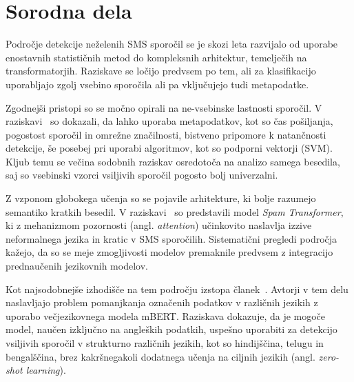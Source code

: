 \documentclass[sigconf,nonacm]{acmart}
\begin{document}


\section{Sorodna dela}

Področje detekcije neželenih SMS sporočil se je skozi leta razvijalo od uporabe enostavnih statističnih metod do kompleksnih arhitektur, 
temelječih na transformatorjih. Raziskave se ločijo predvsem po tem, ali za klasifikacijo uporabljajo zgolj vsebino sporočila ali pa 
vključujejo tudi metapodatke.

Zgodnejši pristopi so se močno opirali na ne-vsebinske lastnosti sporočil. V raziskavi~\cite{6133257} so dokazali, da lahko uporaba 
metapodatkov, kot so čas pošiljanja, pogostost sporočil in omrežne značilnosti, bistveno pripomore k natančnosti detekcije, še posebej 
pri uporabi algoritmov, kot so podporni vektorji (SVM). Kljub temu se večina sodobnih raziskav osredotoča na analizo samega besedila, 
saj so vsebinski vzorci vsiljivih sporočil pogosto bolj univerzalni.

Z vzponom globokega učenja so se pojavile arhitekture, ki bolje razumejo semantiko kratkih besedil. V raziskavi~\cite{9433507} so 
predstavili model \emph{Spam Transformer}, ki z mehanizmom pozornosti (angl. \emph{attention}) učinkovito naslavlja izzive neformalnega 
jezika in kratic v SMS sporočilih. Sistematični pregledi področja~\cite{lota2017systematic} kažejo, da so se meje zmogljivosti modelov 
premaknile predvsem z integracijo prednaučenih jezikovnih modelov.

Kot najsodobnejše izhodišče na tem področju izstopa članek~\cite{inturi2025}. Avtorji v tem delu naslavljajo problem pomanjkanja 
označenih podatkov v različnih jezikih z uporabo večjezikovnega modela mBERT. Raziskava dokazuje, da je mogoče model, naučen izključno 
na angleških podatkih, uspešno uporabiti za detekcijo vsiljivih sporočil v strukturno različnih jezikih, kot so hindijščina, telugu in 
bengalščina, brez kakršnegakoli dodatnega učenja na ciljnih jezikih (angl. \emph{zero-shot learning}).
\end{document}
